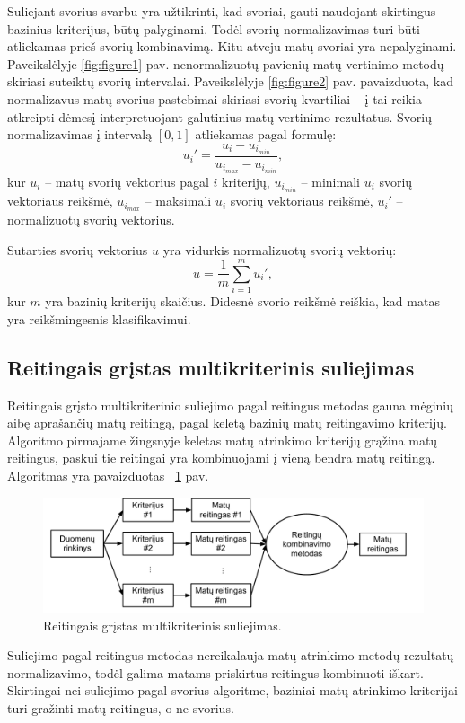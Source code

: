 Suliejant svorius svarbu yra užtikrinti, kad svoriai, gauti naudojant skirtingus bazinius kriterijus, būtų palyginami. Todėl svorių normalizavimas turi būti atliekamas prieš svorių kombinavimą. Kitu atveju matų svoriai yra nepalyginami. Paveikslėlyje \ref{fig:figure1} pav. nenormalizuotų pavienių matų vertinimo metodų skiriasi suteiktų svorių intervalai. Paveikslėlyje \ref{fig:figure2} pav. pavaizduota, kad normalizavus matų svorius pastebimai skiriasi svorių kvartiliai -- į tai reikia atkreipti dėmesį interpretuojant galutinius matų vertinimo rezultatus. Svorių normalizavimas į intervalą $[0, 1]$ atliekamas pagal formulę:
\begin{equation}
 u_i'=\frac{u_i - u_{i_{min}}}{u_{i_{max}} - u_{i_{min}}}, 
\end{equation}
kur $u_i$ -- matų svorių vektorius pagal $i$ kriterijų, 
$u_{i_{min}}$ -- minimali $u_i$ svorių vektoriaus reikšmė,
$u_{i_{max}}$ -- maksimali $u_i$ svorių vektoriaus reikšmė,
$u_i'$ -- normalizuotų svorių vektorius.

Sutarties svorių vektorius $u$ yra vidurkis normalizuotų svorių vektorių:
\begin{equation}
 u = \frac{1}{m}\sum_{i=1}^m u_i',
\end{equation}
kur $m$ yra bazinių kriterijų skaičius. Didesnė svorio reikšmė reiškia, kad matas yra reikšmingesnis klasifikavimui.

\subsection{Reitingais grįstas multikriterinis suliejimas}

Reitingais grįsto multikriterinio suliejimo pagal reitingus metodas gauna mėginių aibę aprašančių matų reitingą, pagal keletą bazinių matų reitingavimo kriterijų. Algoritmo pirmajame žingsnyje keletas matų atrinkimo kriterijų grąžina matų reitingus, paskui tie reitingai yra kombinuojami į vieną bendra matų reitingą. Algoritmas yra
pavaizduotas ~\ref{fig:figure5} pav.
\begin{figure}
 \centering
 \includegraphics[width=1\textwidth]{images/ranking_based_fusion.pdf}
 \caption{Reitingais grįstas multikriterinis suliejimas.}
 \label{fig:figure5}
\end{figure}
Suliejimo pagal reitingus metodas nereikalauja matų atrinkimo metodų rezultatų normalizavimo, todėl galima matams priskirtus reitingus kombinuoti iškart. Skirtingai nei suliejimo pagal svorius algoritme, baziniai matų atrinkimo kriterijai turi gražinti matų reitingus, o ne svorius.

